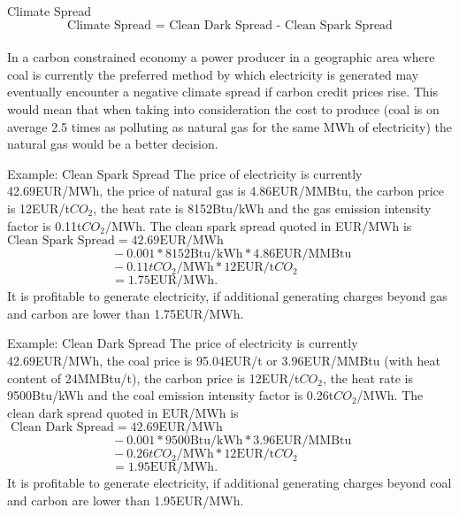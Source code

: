 {Climate Spread}
$$\text{Climate Spread = Clean Dark Spread - Clean Spark Spread}$$\\
  \vspace{0.6cm}
In a carbon constrained economy a power producer in a geographic area where coal is currently the preferred method by which electricity is generated may eventually encounter a negative climate spread  if carbon credit prices rise. This would mean that when taking into consideration the cost to produce (coal is on average 2.5 times as polluting as natural gas for the same MWh of electricity) the natural gas would be a better decision.

{Example: Clean Spark Spread}
The price of electricity is currently 42.69EUR/MWh, the price of natural gas is 4.86EUR/MMBtu, the carbon price is 12EUR/t$CO_2$, the heat rate is 8152Btu/kWh and the gas emission intensity factor is 0.11t$CO_2$/MWh. The clean spark spread quoted in EUR/MWh is\\
$\text{Clean Spark Spread}=42.69\text{EUR/MWh}$\\
$\qquad\qquad\qquad\qquad\;\,-0.001\ast8152\text{Btu/kWh}\ast4.86\text{EUR/MMBtu}$\\
$\qquad\qquad\qquad\qquad\;\,-0.11tCO_2\text{/MWh}\ast12\text{EUR/t}CO_2$\\
$\qquad\qquad\qquad\qquad\;\,=1.75\text{EUR/MWh}.$\\
\vspace{0.2cm}
It is profitable to generate electricity, if additional generating charges beyond gas and carbon are lower than 1.75EUR/MWh.

{Example: Clean Dark Spread}
The price of electricity is currently 42.69EUR/MWh, the coal price is 95.04EUR/t or 3.96EUR/MMBtu (with heat content of 24MMBtu/t), the carbon price is 12EUR/t$CO_2$, the heat rate is 9500Btu/kWh and the coal emission intensity factor is 0.26t$CO_2$/MWh. The clean dark spread quoted in EUR/MWh is\\
$\;\text{Clean Dark Spread}=42.69\text{EUR/MWh}$\\
$\qquad\qquad\qquad\qquad\;\,-0.001\ast9500\text{Btu/kWh}\ast3.96\text{EUR/MMBtu}$\\
$\qquad\qquad\qquad\qquad\;\,-0.26tCO_2\text{/MWh}\ast12\text{EUR/t}CO_2$\\
$\qquad\qquad\qquad\qquad\;\,=1.95\text{EUR/MWh}.$\\
\vspace{0.2cm}
It is profitable to generate electricity, if additional generating charges beyond coal and carbon are lower than 1.95EUR/MWh.


